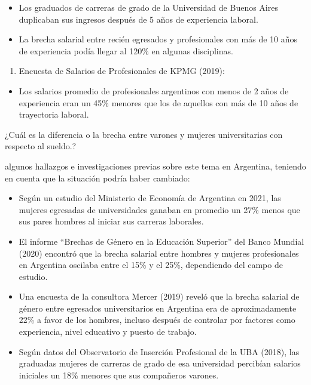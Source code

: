 \documentclass[
]{article}
\providecommand{\tightlist}{%
  \setlength{\itemsep}{0pt}\setlength{\parskip}{0pt}}
\begin{document}
\begin{itemize}
\tightlist
\item
  Los graduados de carreras de grado de la Universidad de Buenos Aires
  duplicaban sus ingresos después de 5 años de experiencia laboral.
\item
  La brecha salarial entre recién egresados y profesionales con más de
  10 años de experiencia podía llegar al 120\% en algunas disciplinas.
\end{itemize}

\begin{enumerate}
\def\labelenumi{\arabic{enumi}.}
\setcounter{enumi}{2}
\tightlist
\item
  Encuesta de Salarios de Profesionales de KPMG (2019):
\end{enumerate}

\begin{itemize}
\tightlist
\item
  Los salarios promedio de profesionales argentinos con menos de 2 años
  de experiencia eran un 45\% menores que los de aquellos con más de 10
  años de trayectoria laboral.
\end{itemize}

¿Cuál es la diferencia o la brecha entre varones y mujeres
universitarias con respecto al sueldo.?

algunos hallazgos e investigaciones previas sobre este tema en
Argentina, teniendo en cuenta que la situación podría haber cambiado:

\begin{itemize}
\item
  Según un estudio del Ministerio de Economía de Argentina en 2021, las
  mujeres egresadas de universidades ganaban en promedio un 27\% menos
  que sus pares hombres al iniciar sus carreras laborales.
\item
  El informe ``Brechas de Género en la Educación Superior'' del Banco
  Mundial (2020) encontró que la brecha salarial entre hombres y mujeres
  profesionales en Argentina oscilaba entre el 15\% y el 25\%,
  dependiendo del campo de estudio.
\item
  Una encuesta de la consultora Mercer (2019) reveló que la brecha
  salarial de género entre egresados universitarios en Argentina era de
  aproximadamente 22\% a favor de los hombres, incluso después de
  controlar por factores como experiencia, nivel educativo y puesto de
  trabajo.
\item
  Según datos del Observatorio de Inserción Profesional de la UBA
  (2018), las graduadas mujeres de carreras de grado de esa universidad
  percibían salarios iniciales un 18\% menores que sus compañeros
  varones.
\end{itemize}
\end{document}
